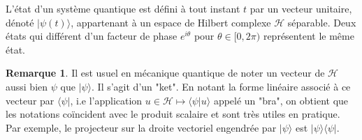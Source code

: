 \documentclass[12pt,openany,a4paper, titlepage]{article}
\newcommand{\HH}{\mathcal{H}}
\theoremstyle{definition}
\theoremstyle{definition}
\theoremstyle{definition}
\theoremstyle{definition}
\theoremstyle{definition}
\newtheorem{rem}{Remarque}
\theoremstyle{definition}
\begin{document}
\vspace{3mm}
\begin{tcolorbox}[colback=gray!5!white,
                  colframe=gray!80!white,
                  title= Postulat 1 : Principe de superposition ]
L'état d'un système quantique est défini à tout instant $t$ par un vecteur unitaire, dénoté $|\psi(t)\rangle$, appartenant à un espace de Hilbert complexe $\HH$ séparable. Deux états qui différent d'un facteur de phase $e^{i\theta}$ pour $\theta\in[0,2\pi)$ représentent le même état.
\end{tcolorbox}
\vspace{3mm}

\begin{rem}
    Il est usuel en mécanique quantique de noter un vecteur 
    de $\HH$ aussi bien $\psi$ que $|\psi\rangle$. Il s'agit d'un "ket". En notant la forme linéaire associé à ce vecteur par $\langle\psi |$, i.e l'application $u\in\HH \mapsto \langle \psi | u\rangle$ appelé un "bra", on obtient que les notations coïncident avec le produit scalaire et sont très utiles en pratique. Par exemple, le projecteur sur la droite vectoriel engendrée par $|\psi\rangle$ est $|\psi\rangle\langle\psi |$.
\end{rem}
\end{document}
